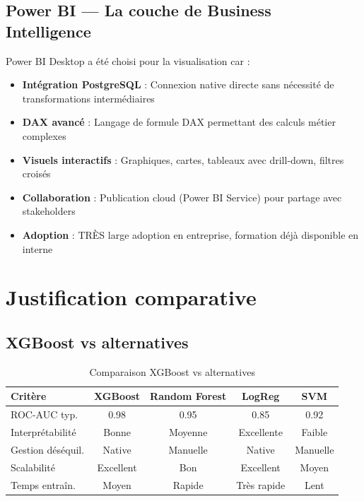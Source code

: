 \documentclass[a4paper,12pt,twoside]{report}
\begin{document}
\subsection{Power BI — La couche de Business Intelligence}

Power BI Desktop a été choisi pour la visualisation car :

\begin{itemize}
    \item \textbf{Intégration PostgreSQL} : Connexion native directe sans nécessité de transformations intermédiaires
    \item \textbf{DAX avancé} : Langage de formule DAX permettant des calculs métier complexes
    \item \textbf{Visuels interactifs} : Graphiques, cartes, tableaux avec drill-down, filtres croisés
    \item \textbf{Collaboration} : Publication cloud (Power BI Service) pour partage avec stakeholders
    \item \textbf{Adoption} : TRÈS large adoption en entreprise, formation déjà disponible en interne
\end{itemize}

\section{Justification comparative}

\subsection{XGBoost vs alternatives}

\begin{table}[H]
\centering
\small
\caption{Comparaison XGBoost vs alternatives}
\begin{tabular}{|l|c|c|c|c|}
\hline
\textbf{Critère} & \textbf{XGBoost} & \textbf{Random Forest} & \textbf{LogReg} & \textbf{SVM} \\
\hline\hline
ROC-AUC typ. & 0.98 & 0.95 & 0.85 & 0.92 \\
\hline
Interprétabilité & Bonne & Moyenne & Excellente & Faible \\
\hline
Gestion déséquil. & Native & Manuelle & Native & Manuelle \\
\hline
Scalabilité & Excellent & Bon & Excellent & Moyen \\
\hline
Temps entraîn. & Moyen & Rapide & Très rapide & Lent \\
\hline
\end{tabular}
\end{table}
\end{document}
